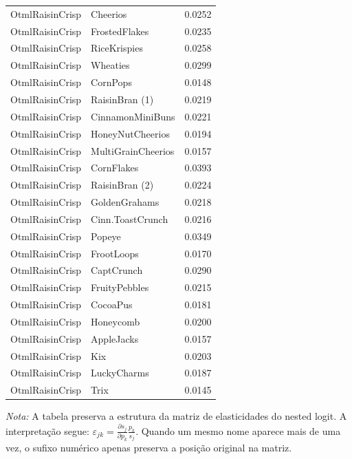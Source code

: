 \begin{table}[H]
\begin{tabular}{llr}
OtmlRaisinCrisp & Cheerios & 0.0252 \\
OtmlRaisinCrisp & FrostedFlakes & 0.0235 \\
OtmlRaisinCrisp & RiceKrispies & 0.0258 \\
OtmlRaisinCrisp & Wheaties & 0.0299 \\
OtmlRaisinCrisp & CornPops & 0.0148 \\
OtmlRaisinCrisp & RaisinBran (1) & 0.0219 \\
OtmlRaisinCrisp & CinnamonMiniBuns & 0.0221 \\
OtmlRaisinCrisp & HoneyNutCheerios & 0.0194 \\
OtmlRaisinCrisp & MultiGrainCheerios & 0.0157 \\
OtmlRaisinCrisp & CornFlakes & 0.0393 \\
OtmlRaisinCrisp & RaisinBran (2) & 0.0224 \\
OtmlRaisinCrisp & GoldenGrahams & 0.0218 \\
OtmlRaisinCrisp & Cinn.ToastCrunch & 0.0216 \\
OtmlRaisinCrisp & Popeye & 0.0349 \\
OtmlRaisinCrisp & FrootLoops & 0.0170 \\
OtmlRaisinCrisp & CaptCrunch & 0.0290 \\
OtmlRaisinCrisp & FruityPebbles & 0.0215 \\
OtmlRaisinCrisp & CocoaPus & 0.0181 \\
OtmlRaisinCrisp & Honeycomb & 0.0200 \\
OtmlRaisinCrisp & AppleJacks & 0.0157 \\
OtmlRaisinCrisp & Kix & 0.0203 \\
OtmlRaisinCrisp & LuckyCharms & 0.0187 \\
OtmlRaisinCrisp & Trix & 0.0145 \\
\bottomrule
\end{tabular}

\vspace{0.3em}
\footnotesize
\textit{Nota:} A tabela preserva a estrutura da matriz de elasticidades do nested logit. A interpretação segue: $\varepsilon_{jk}=\frac{\partial s_j}{\partial p_k}\frac{p_k}{s_j}$. Quando um mesmo nome aparece mais de uma vez, o sufixo numérico apenas preserva a posição original na matriz.
\end{table}
\endgroup


